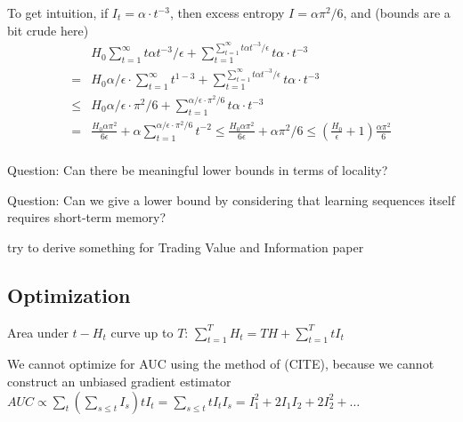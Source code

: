 

To get intuition, if $I_t = \alpha \cdot t^{-3}$, then excess entropy $I=\alpha \pi^2/6$, and (bounds are a bit crude here)
\begin{align}
& H_0 \sum_{t=1}^\infty t \alpha t^{-3}/\epsilon + \sum_{t=1}^{\sum_{t=1}^\infty t \alpha t^{-3}/\epsilon} t \alpha \cdot t^{-3} \\
= & H_0 \alpha/\epsilon \cdot \sum_{t=1}^\infty  t^{1-3} + \sum_{t=1}^{\sum_{t=1}^\infty t \alpha t^{-3}/\epsilon} t \alpha \cdot t^{-3} \\
\leq & H_0 \alpha/\epsilon \cdot \pi^2/6 + \sum_{t=1}^{\alpha/\epsilon \cdot \pi^2/6} t \alpha \cdot t^{-3} \\
= & \frac{H_0 \alpha \pi^2}{6 \epsilon} + \alpha \sum_{t=1}^{\alpha/\epsilon \cdot \pi^2/6}  t^{-2} \leq  \frac{H_0 \alpha \pi^2}{6 \epsilon} + \alpha \pi^2/6  \leq  \left(\frac{H_0}{\epsilon} + 1\right) \frac{\alpha \pi^2}{6} \\
\end{align}


Question: Can there be meaningful lower bounds in terms of locality?

Question: Can we give a lower bound by considering that learning sequences itself requires short-term memory?

try to derive something for Trading Value and Information paper


\subsection{Optimization}
Area under $t - H_t$ curve up to $T$: $\sum_{t=1}^T H_t = T H + \sum_{t=1}^T t I_t$

We cannot optimize for AUC using the method of (CITE), because we cannot construct an unbiased gradient estimator
$AUC \propto \sum_{t} (\sum_{s \leq t} I_s) tI_t = \sum_{s \leq t}  tI_t I_s = I_1^2 + 2 I_1 I_2 + 2 I_2^2 + \dots$



